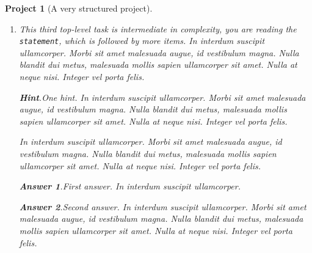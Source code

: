 \documentclass{sn-jnl}
\theoremstyle{thmstyleone}%
\theoremstyle{thmstyletwo}%
\newtheorem{project}[theorem]{Project}
\theoremstyle{thmstylethree}%
\newcommand{\blocktitlefont}{\relax}
\newcommand{\mono}[1]{\texttt{#1}}
\numberwithin{equation}{section}
\begin{document}
\begin{project}[A very structured project]
\begin{enumerate}[font=\bfseries,label=(\alph*),ref=\alph*]
\begin{enumerate}[font=\bfseries,label=(\roman*),ref=\theenumi.\roman*]
\begin{enumerate}[font=\bfseries,label=(\Alph*),ref=\theenumi.\theenumii.\Alph*]
\par
In interdum suscipit ullamcorper. Morbi sit amet malesuada augue, id vestibulum magna. Nulla blandit dui metus, malesuada mollis sapien ullamcorper sit amet. Nulla at neque nisi. Integer vel porta felis.%
\end{enumerate}%
The conclusion of the structured subtask.  In interdum suscipit ullamcorper. Morbi sit amet malesuada augue, id vestibulum magna. Nulla blandit dui metus, malesuada mollis sapien ullamcorper sit amet. Nulla at neque nisi. Integer vel porta felis.%
\item{}A simple task as the last subtask.  In interdum suscipit ullamcorper. Morbi sit amet malesuada augue, id vestibulum magna. Nulla blandit dui metus, malesuada mollis sapien ullamcorper sit amet. Nulla at neque nisi. Integer vel porta felis.%
\end{enumerate}%
This concludes our structured second task.  In interdum suscipit ullamcorper. Morbi sit amet malesuada augue, id vestibulum magna. Nulla blandit dui metus, malesuada mollis sapien ullamcorper sit amet. Nulla at neque nisi. Integer vel porta felis.%
\item{}This third top-level task is intermediate in complexity, you are reading the \mono{statement}, which is followed by more items. In interdum suscipit ullamcorper. Morbi sit amet malesuada augue, id vestibulum magna. Nulla blandit dui metus, malesuada mollis sapien ullamcorper sit amet. Nulla at neque nisi. Integer vel porta felis.%
\par\smallskip%
\noindent\textbf{\blocktitlefont Hint}.\hypertarget{project-structured-7-2}{}\quad{}One hint.  In interdum suscipit ullamcorper. Morbi sit amet malesuada augue, id vestibulum magna. Nulla blandit dui metus, malesuada mollis sapien ullamcorper sit amet. Nulla at neque nisi. Integer vel porta felis.%
\par
In interdum suscipit ullamcorper. Morbi sit amet malesuada augue, id vestibulum magna. Nulla blandit dui metus, malesuada mollis sapien ullamcorper sit amet. Nulla at neque nisi. Integer vel porta felis.%
\par\smallskip%
\noindent\textbf{\blocktitlefont Answer 1}.\hypertarget{project-structured-7-3}{}\quad{}First answer.  In interdum suscipit ullamcorper.%
\par\smallskip%
\noindent\textbf{\blocktitlefont Answer 2}.\hypertarget{project-structured-7-4}{}\quad{}Second answer.  In interdum suscipit ullamcorper. Morbi sit amet malesuada augue, id vestibulum magna. Nulla blandit dui metus, malesuada mollis sapien ullamcorper sit amet. Nulla at neque nisi. Integer vel porta felis.%

\end{enumerate}
\end{project}
\end{document}
